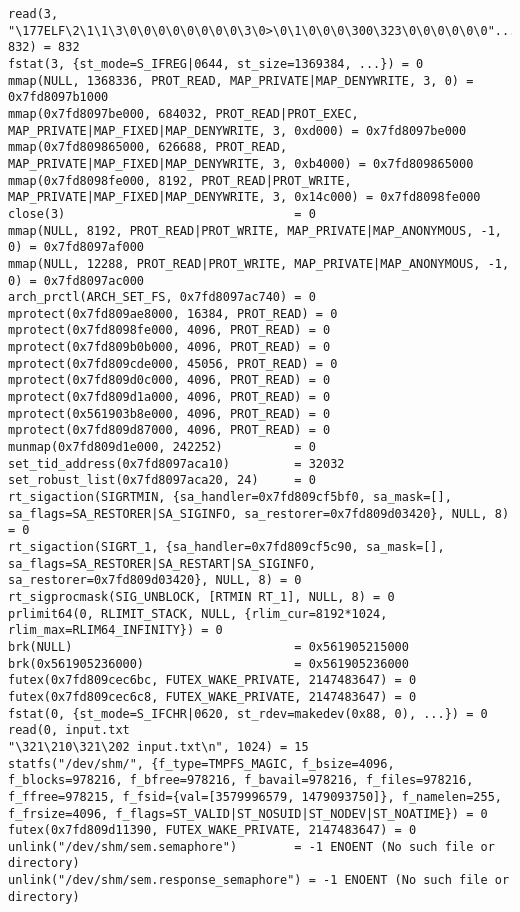 \documentclass[a4paper, 14pt]{article}
\begin{document}
\begin{lstlisting}
read(3, "\177ELF\2\1\1\3\0\0\0\0\0\0\0\0\3\0>\0\1\0\0\0\300\323\0\0\0\0\0\0"..., 832) = 832
fstat(3, {st_mode=S_IFREG|0644, st_size=1369384, ...}) = 0
mmap(NULL, 1368336, PROT_READ, MAP_PRIVATE|MAP_DENYWRITE, 3, 0) = 0x7fd8097b1000
mmap(0x7fd8097be000, 684032, PROT_READ|PROT_EXEC, MAP_PRIVATE|MAP_FIXED|MAP_DENYWRITE, 3, 0xd000) = 0x7fd8097be000
mmap(0x7fd809865000, 626688, PROT_READ, MAP_PRIVATE|MAP_FIXED|MAP_DENYWRITE, 3, 0xb4000) = 0x7fd809865000
mmap(0x7fd8098fe000, 8192, PROT_READ|PROT_WRITE, MAP_PRIVATE|MAP_FIXED|MAP_DENYWRITE, 3, 0x14c000) = 0x7fd8098fe000
close(3)                                = 0
mmap(NULL, 8192, PROT_READ|PROT_WRITE, MAP_PRIVATE|MAP_ANONYMOUS, -1, 0) = 0x7fd8097af000
mmap(NULL, 12288, PROT_READ|PROT_WRITE, MAP_PRIVATE|MAP_ANONYMOUS, -1, 0) = 0x7fd8097ac000
arch_prctl(ARCH_SET_FS, 0x7fd8097ac740) = 0
mprotect(0x7fd809ae8000, 16384, PROT_READ) = 0
mprotect(0x7fd8098fe000, 4096, PROT_READ) = 0
mprotect(0x7fd809b0b000, 4096, PROT_READ) = 0
mprotect(0x7fd809cde000, 45056, PROT_READ) = 0
mprotect(0x7fd809d0c000, 4096, PROT_READ) = 0
mprotect(0x7fd809d1a000, 4096, PROT_READ) = 0
mprotect(0x561903b8e000, 4096, PROT_READ) = 0
mprotect(0x7fd809d87000, 4096, PROT_READ) = 0
munmap(0x7fd809d1e000, 242252)          = 0
set_tid_address(0x7fd8097aca10)         = 32032
set_robust_list(0x7fd8097aca20, 24)     = 0
rt_sigaction(SIGRTMIN, {sa_handler=0x7fd809cf5bf0, sa_mask=[], sa_flags=SA_RESTORER|SA_SIGINFO, sa_restorer=0x7fd809d03420}, NULL, 8) = 0
rt_sigaction(SIGRT_1, {sa_handler=0x7fd809cf5c90, sa_mask=[], sa_flags=SA_RESTORER|SA_RESTART|SA_SIGINFO, sa_restorer=0x7fd809d03420}, NULL, 8) = 0
rt_sigprocmask(SIG_UNBLOCK, [RTMIN RT_1], NULL, 8) = 0
prlimit64(0, RLIMIT_STACK, NULL, {rlim_cur=8192*1024, rlim_max=RLIM64_INFINITY}) = 0
brk(NULL)                               = 0x561905215000
brk(0x561905236000)                     = 0x561905236000
futex(0x7fd809cec6bc, FUTEX_WAKE_PRIVATE, 2147483647) = 0
futex(0x7fd809cec6c8, FUTEX_WAKE_PRIVATE, 2147483647) = 0
fstat(0, {st_mode=S_IFCHR|0620, st_rdev=makedev(0x88, 0), ...}) = 0
read(0, input.txt
"\321\210\321\202 input.txt\n", 1024) = 15
statfs("/dev/shm/", {f_type=TMPFS_MAGIC, f_bsize=4096, f_blocks=978216, f_bfree=978216, f_bavail=978216, f_files=978216, f_ffree=978215, f_fsid={val=[3579996579, 1479093750]}, f_namelen=255, f_frsize=4096, f_flags=ST_VALID|ST_NOSUID|ST_NODEV|ST_NOATIME}) = 0
futex(0x7fd809d11390, FUTEX_WAKE_PRIVATE, 2147483647) = 0
unlink("/dev/shm/sem.semaphore")        = -1 ENOENT (No such file or directory)
unlink("/dev/shm/sem.response_semaphore") = -1 ENOENT (No such file or directory)

\end{lstlisting}
\end{document}
